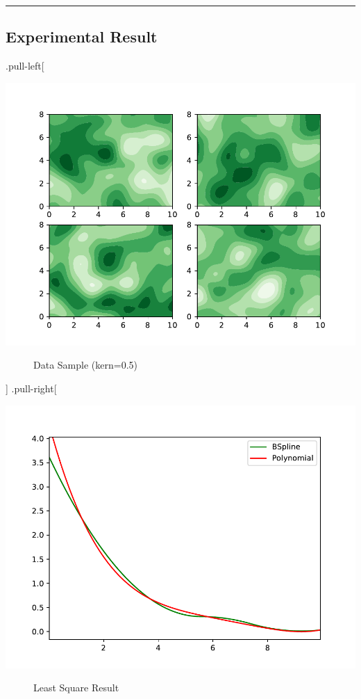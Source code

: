 \documentclass[
]{article}
\begin{document}
\begin{center}\rule{0.5\linewidth}{0.5pt}\end{center}

\subsection{Experimental Result}\label{experimental-result}

.pull-left{[}

\begin{description}
\item[\includegraphics{ellipsoid.files/iso050.pdf}]
Data Sample (kern=0.5)
\end{description}

{]} .pull-right{[}

\begin{description}
\item[\includegraphics{ellipsoid.files/result050.pdf}]
Least Square Result
\end{description}
\end{document}
